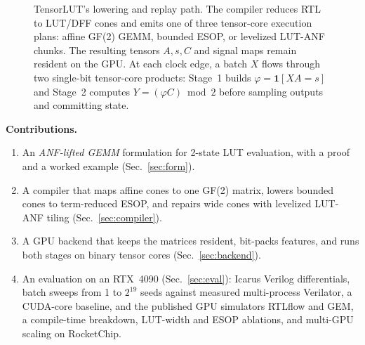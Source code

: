 \documentclass[sigconf]{acmart}
\begin{document}
\begin{figure}[t]
\caption{TensorLUT's lowering and replay path. The compiler reduces RTL to LUT/DFF cones and emits
one of three tensor-core execution plans: affine GF(2) GEMM, bounded ESOP, or levelized LUT-ANF
chunks. The resulting tensors $A,s,C$ and signal maps remain resident on the GPU. At each clock edge,
a batch $X$ flows through two single-bit tensor-core products: Stage~1 builds
$\varphi=\mathbf{1}[XA{=}s]$ and Stage~2 computes $Y=(\varphi C)\bmod 2$ before sampling outputs
and committing state.}
\label{fig:flow}
\end{figure}

\textbf{Contributions.}
\begin{enumerate}
\item An \emph{ANF-lifted GEMM} formulation for 2-state LUT evaluation, with a proof
and a worked example (Sec.~\ref{sec:form}).
\item A compiler that maps affine cones to one GF(2) matrix, lowers bounded cones to
term-reduced ESOP, and repairs wide cones with levelized LUT-ANF tiling (Sec.~\ref{sec:compiler}).
\item A GPU backend that keeps the matrices resident, bit-packs features, and runs both stages on
binary tensor cores (Sec.~\ref{sec:backend}).
\item An evaluation on an RTX~4090 (Sec.~\ref{sec:eval}): Icarus Verilog differentials, batch
sweeps from 1 to $2^{19}$ seeds against measured multi-process Verilator, a CUDA-core baseline, and
the published GPU simulators RTLflow and GEM, a compile-time breakdown, LUT-width and ESOP ablations,
and multi-GPU scaling on RocketChip.
\end{enumerate}
\end{document}
